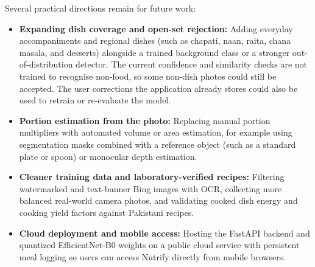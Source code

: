 \documentclass[11pt,a4paper]{article}
\begin{document}
Several practical directions remain for future work:
\begin{itemize}
  \item \textbf{Expanding dish coverage and open-set rejection:} Adding
        everyday accompaniments and regional dishes (such as chapati, naan,
        raita, chana masala, and desserts) alongside a trained background class or a stronger
        out-of-distribution detector. The current confidence and similarity checks
        are not trained to recognise non-food, so some non-dish photos could still
        be accepted. The user corrections the application already stores could
        also be used to retrain or re-evaluate the model.
  \item \textbf{Portion estimation from the photo:} Replacing manual portion
        multipliers with automated volume or area estimation, for example using
        segmentation masks combined with a reference object (such as a standard
        plate or spoon) or monocular depth estimation.
  \item \textbf{Cleaner training data and laboratory-verified recipes:}
        Filtering watermarked and text-banner Bing images with OCR, collecting
        more balanced real-world camera photos, and validating cooked dish
        energy and cooking yield factors against Pakistani recipes.
  \item \textbf{Cloud deployment and mobile access:} Hosting the FastAPI
        backend and quantized EfficientNet-B0 weights on a public cloud service
        with persistent meal logging so users can access Nutrify directly from
        mobile browsers.
\end{itemize}





\end{document}
